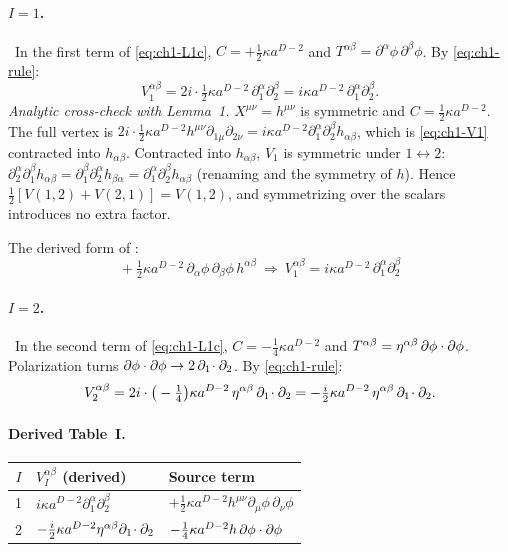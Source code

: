 \paragraph{$I=1$.} \tD\ In the first term of \eqref{eq:ch1-L1c},
$C=+\tfrac12\kappa a^{D-2}$ and $T^{\alpha\beta}=\partial^\alpha\phi\,\partial^\beta\phi$.
By \eqref{eq:ch1-rule}:
\begin{equation}
V_1^{\alpha\beta}=2i\cdot\tfrac12\kappa a^{D-2}\,\partial_1^\alpha\partial_2^\beta=i\kappa a^{D-2}\,\partial_1^\alpha\partial_2^\beta .
\label{eq:ch1-V1}
\end{equation}
\emph{Analytic cross-check with Lemma~1.} $X^{\mu\nu}=h^{\mu\nu}$ is symmetric
and $C=\tfrac12\kappa a^{D-2}$. The full vertex is
$2i\cdot\tfrac12\kappa a^{D-2}h^{\mu\nu}\partial_{1\mu}\partial_{2\nu}=i\kappa a^{D-2}\partial_1^\alpha\partial_2^\beta h_{\alpha\beta}$,
which is \eqref{eq:ch1-V1} contracted into $h_{\alpha\beta}$. Contracted into
$h_{\alpha\beta}$, $V_1$ is symmetric under $1\leftrightarrow2$:
$\partial_2^\alpha\partial_1^\beta h_{\alpha\beta}=\partial_1^\beta\partial_2^\alpha h_{\beta\alpha}=\partial_1^\alpha\partial_2^\beta h_{\alpha\beta}$
(renaming and the symmetry of $h$). Hence $\tfrac12[V(1,2)+V(2,1)]=V(1,2)$, and
symmetrizing over the scalars introduces no extra factor.

The derived form of :
\begin{equation*}
\boxed{\;+\tfrac12\kappa a^{D-2}\,\partial_\alpha\phi\,\partial_\beta\phi\,h^{\alpha\beta}\ \Rightarrow\ V_1^{\alpha\beta}=i\kappa a^{D-2}\,\partial_1^\alpha\partial_2^\beta\;}
\tag{I.7$'$}\label{eq:ch1-eq7}
\end{equation*}

\paragraph{$I=2$.} \tD\ In the second term of \eqref{eq:ch1-L1c},
$C=-\tfrac14\kappa a^{D-2}$ and $T^{\alpha\beta}=\eta^{\alpha\beta}\,\partial\phi\cdot\partial\phi$.
Polarization turns $\partial\phi\cdot\partial\phi\to2\,\partial_1\!\cdot\partial_2$. By \eqref{eq:ch1-rule}:
\begin{equation}
V_2^{\alpha\beta}=2i\cdot\big(-\tfrac14\big)\kappa a^{D-2}\,\eta^{\alpha\beta}\,\partial_1\!\cdot\partial_2=-\tfrac i2\kappa a^{D-2}\,\eta^{\alpha\beta}\,\partial_1\!\cdot\partial_2 .
\label{eq:ch1-V2}
\end{equation}

\paragraph{Derived Table~I.}
\begin{center}
\small
\begin{tabular}{cll}
\toprule
$I$ & $V_I^{\alpha\beta}$ (derived) & Source term\\
\midrule
1 & $i\kappa a^{D-2}\partial_1^\alpha\partial_2^\beta$ & $+\tfrac12\kappa a^{D-2}h^{\mu\nu}\partial_\mu\phi\,\partial_\nu\phi$\\
2 & $-\tfrac i2\kappa a^{D-2}\eta^{\alpha\beta}\partial_1\!\cdot\partial_2$ & $-\tfrac14\kappa a^{D-2}h\,\partial\phi\cdot\partial\phi$\\
\bottomrule
\end{tabular}
\end{center}

